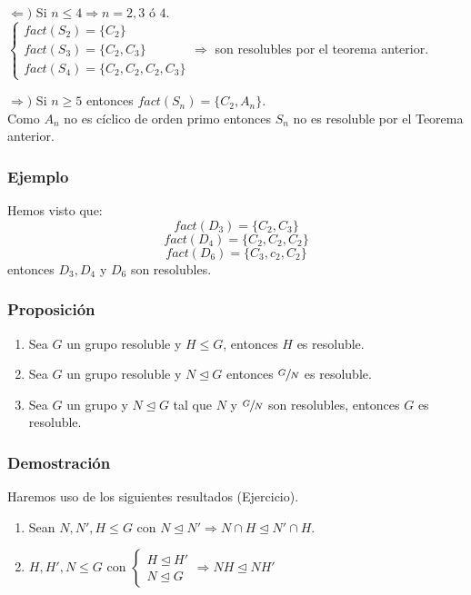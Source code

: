 \documentclass[11pt,a4paper]{article}
\begin{document}
\begin{enumerate*}
\item[$\Leftarrow)$] Si $n \leq 4 \Rightarrow n=2, 3$ ó $4$. \\
$\begin{cases}
fact(S_{2}) = \{C_{2}\} \\
fact(S_{3}) = \{C_{2}, C_{3}\} \\
fact(S_{4}) = \{C_{2}, C_{2}, C_{2}, C_{3}\}
\end{cases}
\Rightarrow$ son resolubles por el teorema anterior.
\item[$\Rightarrow)$] Si $n \geq 5$ entonces $fact(S_{n}) = \{C_{2}, A_{n}\}$. \\
Como $A_{n}$ no es cíclico de orden primo entonces $S_{n}$ no es resoluble por el Teorema anterior.
\end{enumerate*}

\subsubsection*{Ejemplo}

Hemos visto que:
$$fact(D_{3}) = \{C_{2}, C_{3}\}$$
$$fact(D_{4}) = \{C_{2}, C_{2}, C_{2}\}$$
$$fact(D_{6}) = \{C_{3}, c_{2}, C_{2}\}$$
entonces $D_{3}, D_{4}$ y $D_{6}$ son resolubles.

\subsubsection*{Proposición}

\begin{enumerate}[label = \arabic*)]
\item Sea $G$ un grupo resoluble y $H \leqslant G$, entonces $H$ es resoluble.
\item Sea $G$ un grupo resoluble y $N \unlhd G$ entonces $\sfrac{G}{N}$ es resoluble.
\item Sea $G$ un grupo y $N \unlhd G$ tal que $N$ y $\sfrac{G}{N}$ son resolubles, entonces $G$ es resoluble.
\end{enumerate}

\subsubsection*{Demostración}

Haremos uso de los siguientes resultados (Ejercicio).

\begin{enumerate}[label = (\alph*)]
\item Sean $N, N', H \leqslant G$ con $N \unlhd N' \Rightarrow N \cap H \unlhd N' \cap H$.
\item $H, H', N \leqslant G$ con
$\begin{cases}
H \unlhd H' \\
N \unlhd G
\end{cases}
\Rightarrow NH \unlhd NH'$
\end{enumerate}
\end{document}
